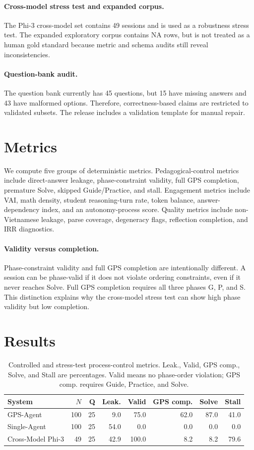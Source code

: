 \documentclass[11pt]{article}
\begin{document}
\paragraph{Cross-model stress test and expanded corpus.} The Phi-3 cross-model set contains 49 sessions and is used as a robustness stress test. The expanded exploratory corpus contains NA rows, but is not treated as a human gold standard because metric and schema audits still reveal inconsistencies.

\paragraph{Question-bank audit.} The question bank currently has 45 questions, but 15 have missing answers and 43 have malformed options. Therefore, correctness-based claims are restricted to validated subsets. The release includes a validation template for manual repair.

\section{Metrics}
We compute five groups of deterministic metrics. Pedagogical-control metrics include direct-answer leakage, phase-constraint validity, full GPS completion, premature Solve, skipped Guide/Practice, and stall. Engagement metrics include VAI, math density, student reasoning-turn rate, token balance, answer-dependency index, and an autonomy-process score. Quality metrics include non-Vietnamese leakage, parse coverage, degeneracy flags, reflection completion, and IRR diagnostics.

\paragraph{Validity versus completion.} Phase-constraint validity and full GPS completion are intentionally different. A session can be phase-valid if it does not violate ordering constraints, even if it never reaches Solve. Full GPS completion requires all three phases G, P, and S. This distinction explains why the cross-model stress test can show high phase validity but low completion.

\section{Results}
\begin{table}[t]
\centering
\small
\begin{tabular}{lrrrrrrr}
\toprule
System & $N$ & Q & Leak. & Valid & GPS comp. & Solve & Stall \\
\midrule
GPS-Agent & 100 & 25 & 9.0 & 75.0 & 62.0 & 87.0 & 41.0 \\
Single-Agent & 100 & 25 & 54.0 & 0.0 & 0.0 & 0.0 & 0.0 \\
Cross-Model Phi-3 & 49 & 25 & 42.9 & 100.0 & 8.2 & 8.2 & 79.6 \\
\bottomrule
\end{tabular}
\caption{Controlled and stress-test process-control metrics. Leak., Valid, GPS comp., Solve, and Stall are percentages. Valid means no phase-order violation; GPS comp. requires Guide, Practice, and Solve.}
\label{tab:main}
\end{table}
\end{document}

